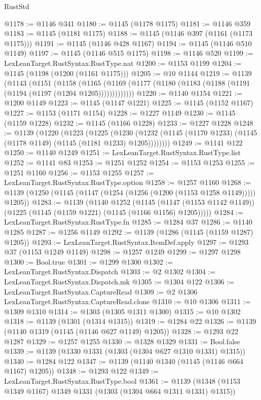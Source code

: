 \begin{lexlean}{RustStd}
\begin{coremodule}
@1178 := @1146 @341
@1180 := @1145 (@1178 @1175)
@1181 := @1146 @359
@1183 := @1145 (@1181 @1175)
@1188 := @1145 (@1146 @397 (@1161 (@1173 @1175)))
@1191 := @1145 (@1146 @428 @1167)
@1194 := @1145 (@1146 @510 @1149)
@1197 := @1145 (@1146 @515 @1175)
@1198 := @1146 @520
@1199 := LexLeanTarget.RustSyntax.RustType.nat
@1200 := @1153 @1199
@1204 := @1145 (@1198 (@1200 (@1161 @1175)))
@1205 := @10 @1144
@1219 := @1139
    (@1143
      (@1151
        (@1158
          (@1165 (@1169 (@1177 (@1180 (@1183 (@1188 (@1191 (@1194 (@1197 (@1204 @1205)))))))))))))
@1220 := @1140 @1154
@1221 := @1200 @1149
@1223 := @1145 (@1147 @1221)
@1225 := @1145 (@1152 @1167)
@1227 := @1153 (@1171 @1154)
@1228 := @1227 @1149
@1230 := @1145 (@1159 @1228)
@1232 := @1145 (@1166 @1228)
@1233 := @1227 @1228
@1248 := @1139
    (@1220
      (@1223
        (@1225
          (@1230 (@1232 (@1145 (@1170 @1233) (@1145 (@1178 @1149) (@1145 (@1181 @1233) @1205))))))))
@1249 := @1141 @122
@1250 := @1140 @1249
@1251 := LexLeanTarget.RustSyntax.RustType.list
@1252 := @1141 @83
@1253 := @1251 @1252
@1254 := @1153 @1253
@1255 := @1251 @1160
@1256 := @1153 @1255
@1257 := LexLeanTarget.RustSyntax.RustType.option
@1258 := @1257 @1160
@1268 := @1139 (@1250 (@1145 (@1147 (@1254 (@1256 (@1200 (@1153 @1258 @1149))))) @1205))
@1283 := @1139
    (@1140
      @1252
      (@1145 (@1147 (@1153 @1142 @1149)) (@1225 (@1145 (@1159 @1221) (@1145 (@1166 @1156) @1205)))))
@1284 := LexLeanTarget.RustSyntax.RustType.fn
@1285 := @1284 @37
@1286 := @1140 @1285
@1287 := @1256 @1149
@1292 := @1139 (@1286 (@1145 (@1159 @1287) @1205))
@1293 := LexLeanTarget.RustSyntax.ItemDef.apply
@1297 := @1293 @37 (@1153 @1249 @1149)
@1298 := @1257 @1249
@1299 := @1297 @1298
@1300 := Bool.true
@1301 := @1299 @1300
@1302 := LexLeanTarget.RustSyntax.Dispatch
@1303 := @2 @1302
@1304 := LexLeanTarget.RustSyntax.Dispatch.mk
@1305 := @1304 @122
@1306 := LexLeanTarget.RustSyntax.CaptureRead
@1309 := @2 @1306 LexLeanTarget.RustSyntax.CaptureRead.clone
@1310 := @10 @1306
@1311 := @1309 @1310
@1314 := @1303 (@1305 @1311 @1300)
@1315 := @10 @1302
@1318 := @1139 (@1301 (@1314 @1315))
@1319 := @1284 @22
@1326 := @1139 (@1140 @1319 (@1145 (@1146 @627 @1149) @1205))
@1328 := @1293 @22 @1287
@1329 := @1257 @1255
@1330 := @1328 @1329
@1331 := Bool.false
@1339 := @1139 (@1330 @1331 (@1303 (@1304 @627 @1310 @1331) @1315))
@1340 := @1284 @122
@1347 := @1139 (@1140 @1340 (@1145 (@1146 @664 @1167) @1205))
@1348 := @1293 @122
@1349 := LexLeanTarget.RustSyntax.RustType.bool
@1361 := @1139 (@1348 (@1153 @1349 @1167) @1349 @1331 (@1303 (@1304 @664 @1311 @1331) @1315))

\end{coremodule}
\end{lexlean}
